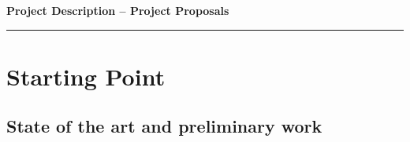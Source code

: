 \documentclass{scrartcl}
\newcommand{\applicants}{[First name  last name, city of all applicants]}
\newcommand{\project}{[Project title]}
\begin{document}
\pagestyle{empty}
\setcounter{page}{1}

%

\cleardoublepage
\pagestyle{plain}


{\raggedright{} \normalsize \bfseries 
	Project Description -- Project Proposals \par
	\applicants{} \par
	\project{} \par
	\rule{\textwidth}{0.5pt} \par
}

\section{Starting Point}
\label{sec:work-report}

\subsection*{State of the art and preliminary work}
\end{document}
